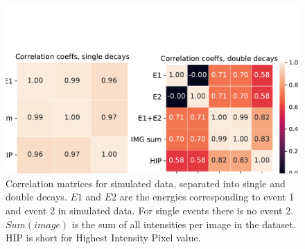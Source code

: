 \begin{figure}
\centering
\includegraphics[width=\textwidth]{chapters/results/figures/simulated_corrcoeff.pdf}
\caption{\label{fig:simulated_corrcoeff}Correlation matrices for simulated data,
    separated into single and double decays. $E1$ and $E2$ are the energies corresponding
    to event 1 and event 2 in simulated data. For single events there is no event 2.
    $Sum(image)$ is the sum of all intensities per image in the dataset. HIP is short for
    Highest Intensity Pixel value.
    }
\end{figure}
